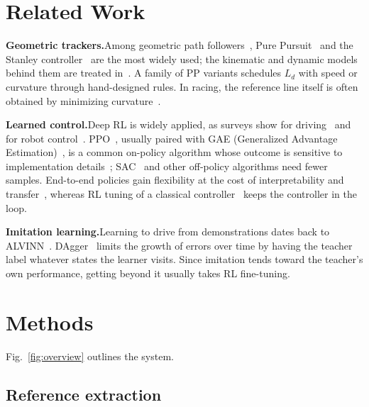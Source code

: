 \documentclass[10pt,twocolumn,twoside]{article}
\newcommand{\parhead}[1]{\textbf{#1}\hspace{0.4em}}
\newcommand{\Ld}{L_d}
\begin{document}
\section{Related Work}

\parhead{Geometric trackers.}Among geometric path followers~\cite{snider2009},
Pure Pursuit~\cite{coulter1992} and the Stanley controller~\cite{hoffmann2007}
are the most widely used; the kinematic and dynamic models behind them are
treated in~\cite{rajamani2012,kong2015}. A family of PP variants schedules $\Ld$
with speed or curvature through hand-designed rules. In racing, the reference
line itself is often obtained by minimizing
curvature~\cite{heilmeier2020,betz2022}.

\parhead{Learned control.}Deep RL is widely applied, as surveys show
for driving~\cite{kiran2022} and for robot control~\cite{kober2013}.
PPO~\cite{schulman2017ppo}, usually paired with GAE (Generalized Advantage
Estimation)~\cite{schulman2016gae}, is a common on-policy algorithm whose
outcome is sensitive to implementation details~\cite{andrychowicz2021};
SAC~\cite{haarnoja2018} and other off-policy algorithms need fewer samples. End-to-end policies gain
flexibility at the cost of interpretability and transfer~\cite{evans2023},
whereas RL tuning of a classical controller~\cite{elgouhary2026} keeps the
controller in the loop.

\parhead{Imitation learning.}Learning to drive from demonstrations dates back
to ALVINN~\cite{pomerleau1989}. DAgger~\cite{ross2011dagger} limits the growth
of errors over time by having the teacher label whatever states the learner
visits. Since imitation tends toward the teacher's own performance, getting
beyond it usually takes RL fine-tuning.

\section{Methods}

Fig.~\ref{fig:overview} outlines the system.

\subsection{Reference extraction}
\end{document}
